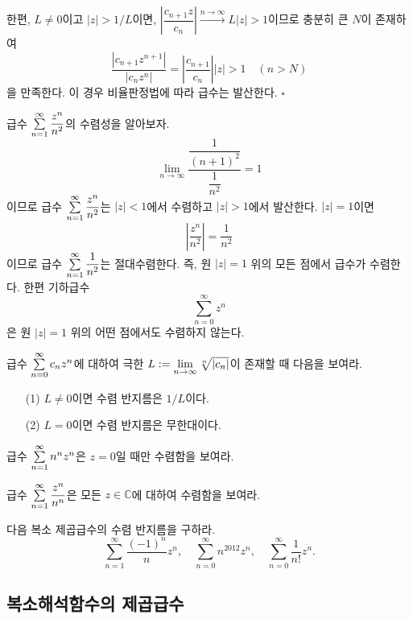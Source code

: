 한편, $L\ne0$이고 $|z|>1/L$이면,
$\left|\dfrac{c_{n+1}z}{c_n}\right|
\xrightarrow{n\to\infty}
L|z|>1$이므로
충분히 큰 $N$이 존재하여
\[
\dfrac{|c_{n+1}z^{n+1}|}{|c_nz^n|}
= \left| \dfrac{c_{n+1}}{c_n}\right| |z|>1
\quad (n>N)
\]
을 만족한다.
이 경우 비율판정법에 따라 급수는 발산한다.
\hfill $\square$

\begin{saltexample}[label=example-4-2]{}{}
급수 $\sum\limits_{n=1}^\infty \displaystyle\frac{z^n}{n^2}$의 수렴성을 알아보자.
\[
\lim_{n\to\infty} \dfrac{\dfrac1{(n+1)^2}}{\dfrac1{n^2}} = 1
\]
이므로 
급수 $\sum\limits_{n=1}^\infty \displaystyle\frac{z^n}{n^2}$는
$|z|<1$에서 수렴하고
$|z|>1$에서 발산한다.
$|z|=1$이면
\[
\left| \dfrac{z^n}{n^2} \right| = \dfrac1{n^2}
\]
이므로 급수 $\sum\limits_{n=1}^\infty \displaystyle\frac{1}{n^2}$는
절대수렴한다. 즉, 원 $|z|=1$ 위의 모든 점에서 급수가 수렴한다.
\saltfigskip
한편 기하급수 
\[
\sum_{n=0}^\infty z^n
\]
은 원 $|z|=1$ 위의 어떤 점에서도 수렴하지 않는다.
\end{saltexample}

\begin{salt_exercise}\label{ex-4-6}
급수 $\sum\limits_{n=0}^\infty c_nz^n$에 대하여
극한 $L:=\lim\limits_{n\to\infty} \sqrt[n]{|c_n|}$이 존재할 때
다음을 보여라.
\begin{itemize}
\item[(1)] $L\ne 0$이면 수렴 반지름은 $1/L$이다.
\item[(2)] $L=0$이면 수렴 반지름은 무한대이다.
\end{itemize}
\end{salt_exercise}

\begin{salt_exercise}\label{ex-4-7}
급수 $\sum\limits_{n=1}^\infty n^nz^n$은
$z=0$일 때만 수렴함을 보여라.
\end{salt_exercise}

\begin{salt_exercise}\label{ex-4-8}
급수 $\sum\limits_{n=1}^\infty \displaystyle\frac{z^n}{n^n}$은
모든 $z\in\mathbb C$에 대하여 수렴함을 보여라.
\end{salt_exercise}

\begin{salt_exercise}\label{ex-4-9}
다음 복소 제곱급수의 수렴 반지름을 구하라.
\[
\sum_{n=1}^\infty \dfrac{(-1)^n}{n}z^n,\quad
\sum_{n=0}^\infty n^{2012}z^n, \quad
\sum_{n=0}^\infty \dfrac1{n!}z^n.
\]
\end{salt_exercise}

\subsection{복소해석함수의 제곱급수}

